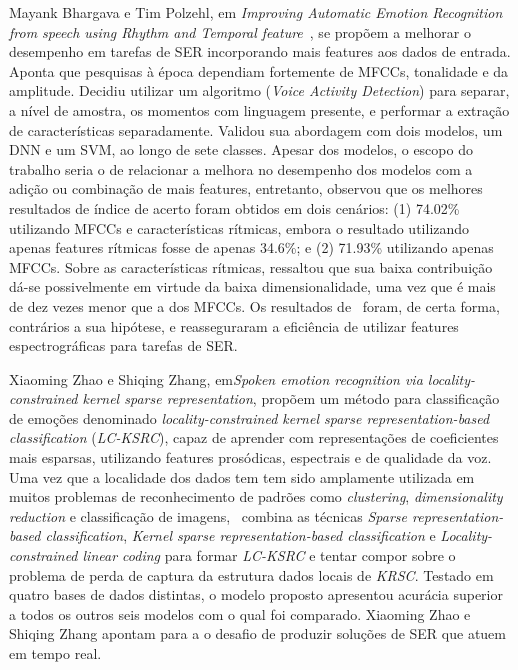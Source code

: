 Mayank Bhargava e Tim Polzehl, em \textit{Improving Automatic Emotion Recognition from speech using Rhythm and Temporal feature}~\cite{11}, se propõem a melhorar o desempenho em tarefas de \acrshort{SER} incorporando mais features aos dados de entrada. Aponta que pesquisas à época dependiam fortemente de \acrshort{MFCC}s, tonalidade e da amplitude. Decidiu utilizar um algoritmo (\textit{Voice Activity Detection}) para separar, a nível de amostra, os momentos com linguagem presente, e performar a extração de características separadamente. Validou sua abordagem com dois modelos, um \acrshort{DNN} e um \acrshort{SVM}, ao longo de sete classes. Apesar dos modelos, o escopo do trabalho seria o de relacionar a melhora no desempenho dos modelos com a adição ou combinação de mais features, entretanto, observou que os melhores resultados de índice de acerto foram obtidos em dois cenários: (1) 74.02\% utilizando \acrshort{MFCC}s e características rítmicas, embora o resultado utilizando apenas features rítmicas fosse de apenas 34.6\%; e (2) 71.93\% utilizando apenas \acrshort{MFCC}s. Sobre as características rítmicas, ressaltou que sua baixa contribuição dá-se possivelmente em virtude da baixa dimensionalidade, uma vez que é mais de dez vezes menor que a dos \acrshort{MFCC}s. Os resultados de~\cite{11} foram, de certa forma, contrários a sua hipótese, e reasseguraram a eficiência de utilizar features espectrográficas para tarefas de SER.

Xiaoming Zhao e Shiqing Zhang, em\textit{Spoken emotion recognition via locality-constrained kernel sparse representation}\cite{32.31}, propõem um método para classificação de emoções denominado \textit{locality-constrained kernel sparse representation-based classification} (\textit{LC-KSRC}), capaz de aprender com representações de coeficientes mais esparsas, utilizando features prosódicas, espectrais e de qualidade da voz. Uma vez que a localidade dos dados tem tem sido amplamente utilizada em muitos problemas de reconhecimento de padrões como \textit{clustering}, \textit{dimensionality reduction} e classificação de imagens,~\cite{32.31} combina as técnicas \textit{Sparse representation-based classification}, \textit{Kernel sparse representation-based classification} e \textit{Locality-constrained linear coding} para formar \textit{LC-KSRC} e tentar compor sobre o problema de perda de captura da estrutura dados locais de \textit{KRSC}. Testado em quatro bases de dados distintas, o modelo proposto apresentou acurácia superior a todos os outros seis modelos com o qual foi comparado. Xiaoming Zhao e Shiqing Zhang apontam para a o desafio de produzir soluções de SER que atuem em tempo real.

